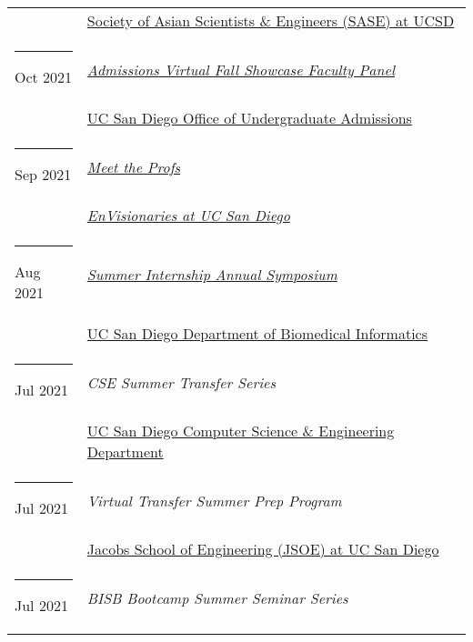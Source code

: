 \documentclass[margin,line]{res}
\begin{document}
\begin{resume}
\begin{longtable}{@{}p{0.7in}p{4in}}
\hspace*{-4mm} & \hspace{4mm} \href{https://saseatucsd.weebly.com/}{Society of Asian Scientists \& Engineers (SASE) at UCSD}\\
\hspace*{-4mm} \rule{-1mm}{5mm} Oct 2021 & \href{https://beatriton.ucsd.edu/register/ucsdvirtualfallshowcase}{\textit{Admissions Virtual Fall Showcase Faculty Panel}}\\*
\hspace*{-4mm} & \hspace{4mm} \href{https://admissions.ucsd.edu/}{UC San Diego Office of Undergraduate Admissions}\\
\hspace*{-4mm} \rule{-1mm}{5mm} Sep 2021 & \href{https://www.facebook.com/events/610194613335437}{\textit{Meet the Profs}}\\*
\hspace*{-4mm} & \hspace{4mm} \href{https://www.facebook.com/envisionariesUCSD/}{\textit{EnVisionaries at UC San Diego}}\\
\hspace*{-4mm} \rule{-1mm}{5mm} Aug 2021 & \href{https://dbmi.ucsd.edu/education/internships/index.html}{\textit{Summer Internship Annual Symposium}}\\*
\hspace*{-4mm} & \hspace{4mm} \href{https://dbmi.ucsd.edu/}{UC San Diego Department of Biomedical Informatics}\\
\hspace*{-4mm} \rule{-1mm}{5mm} Jul 2021 & \textit{CSE Summer Transfer Series}\\*
\hspace*{-4mm} & \hspace{4mm} \href{https://cse.ucsd.edu/}{UC San Diego Computer Science \& Engineering Department}\\
\hspace*{-4mm} \rule{-1mm}{5mm} Jul 2021 & \textit{Virtual Transfer Summer Prep Program}\\*
\hspace*{-4mm} & \hspace{4mm} \href{https://jacobsschool.ucsd.edu/}{Jacobs School of Engineering (JSOE) at UC San Diego}\\
\hspace*{-4mm} \rule{-1mm}{5mm} Jul 2021 & \textit{BISB Bootcamp Summer Seminar Series}\\*

\end{longtable}
\end{resume}
\end{document}
